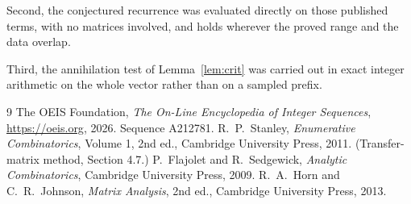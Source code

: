 \documentclass[11pt,a4paper]{article}
\theoremstyle{plain}
\theoremstyle{definition}
\begin{document}
Second, the conjectured recurrence was evaluated directly on those published terms, with no
matrices involved, and holds wherever the proved range and the data overlap.

Third, the annihilation test of Lemma~\ref{lem:crit} was carried out in exact integer
arithmetic on the whole vector rather than on a sampled prefix.

\begin{thebibliography}{9}
 The OEIS Foundation, \emph{The On-Line Encyclopedia of Integer
Sequences}, \url{https://oeis.org}, 2026. Sequence A212781.
 R.~P.~Stanley, \emph{Enumerative Combinatorics}, Volume 1, 2nd ed.,
Cambridge University Press, 2011. (Transfer-matrix method, Section 4.7.)
 P.~Flajolet and R.~Sedgewick, \emph{Analytic Combinatorics}, Cambridge
University Press, 2009.
 R.~A.~Horn and C.~R.~Johnson, \emph{Matrix Analysis}, 2nd ed., Cambridge
University Press, 2013.
\end{thebibliography}
\end{document}
